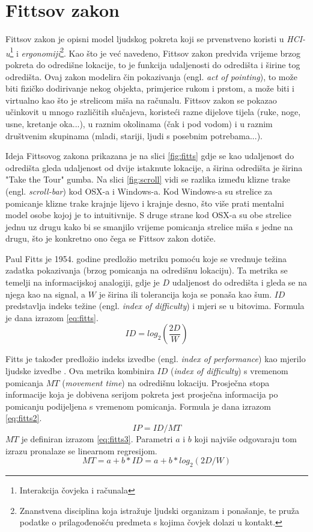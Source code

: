 \documentclass[times, utf8, zavrsni]{fer}
\begin{document}
\section{Fittsov zakon}
\label{sec:fitts}
Fittsov zakon je opisni model ljudskog pokreta koji se prvenstveno koristi u \emph{HCI-u}\footnote{Interakcija čovjeka i računala } i \emph{ergonomiji}\footnote{Znanstvena disciplina koja istražuje ljudski organizam i ponašanje, te pruža podatke o prilagođenošću predmeta s kojima čovjek dolazi u kontakt.}. Kao što je već navedeno, Fittsov zakon predviđa vrijeme brzog pokreta do odredišne lokacije, to je funkcija udaljenosti do odredišta i širine tog odredišta. Ovaj zakon modelira čin pokazivanja (engl. \emph{act of pointing}), to može biti fizičko dodirivanje nekog objekta, primjerice rukom i prstom, a može biti i virtualno kao što je strelicom miša na računalu. Fittsov zakon se pokazao učinkovit u mnogo različitih slučajeva, koristeći razne dijelove tijela (ruke, noge, usne, kretanje oka...), u raznim okolinama (čak i pod vodom) i u raznim društvenim skupinama (mladi, stariji, ljudi s posebnim potrebama...). 

Ideja Fittsovog zakona prikazana je na slici \ref{fig:fitts} gdje se kao udaljenost do odredišta gleda udaljenost od dvije istaknute lokacije, a širina odredišta je širina "Take the Tour" gumba. Na slici \ref{fig:scroll} vidi se razlika između klizne trake (engl. \emph{scroll-bar}) kod OSX-a i Windows-a. Kod Windows-a su strelice za pomicanje klizne trake krajnje lijevo i krajnje desno, što više prati mentalni model osobe kojoj je to intuitivnije. S druge strane kod OSX-a su obe strelice jednu uz drugu kako bi se smanjilo vrijeme pomicanja strelice miša s jedne na drugu, što je konkretno ono čega se Fittsov zakon dotiče.

Paul Fitts je 1954. godine predložio metriku pomoću koje se vrednuje težina zadatka pokazivanja (brzog pomicanja na odredišnu lokaciju). Ta metrika se temelji na informacijskoj analogiji, gdje je $D$ udaljenost do odredišta i gleda se na njega kao na signal, a $W$ je širina ili tolerancija koja se ponaša kao šum. $ID$ predstavlja indeks težine (engl. \emph{index of difficulty}) i mjeri se u bitovima. Formula je dana izrazom \ref{eq:fitts}.
\begin{equation}
\label{eq:fitts}
ID = log_2(\frac{2D}{W})
\end{equation}

Fitts je također predložio indeks izvedbe (engl. \emph{index of performance}) kao mjerilo ljudske izvedbe . Ova metrika kombinira $ID$ (\emph{index of difficulty}) s vremenom pomicanja $MT$ (\emph{movement time}) na odredišnu lokaciju. Prosječna stopa informacije koja je dobivena serijom pokreta jest prosječna informacija po pomicanju podijeljena s vremenom pomicanja. Formula je dana izrazom \ref{eq:fitts2}.
\begin{equation}
\label{eq:fitts2}
IP = ID/MT
\end{equation}
$MT$ je definiran izrazom \ref{eq:fitts3}. Parametri $a$ i $b$ koji najviše odgovaraju tom izrazu pronalaze se linearnom regresijom.
\begin{equation}
\label{eq:fitts3}
MT = a+b*ID = a+b*log_2(2D/W)
\end{equation}
\end{document}
